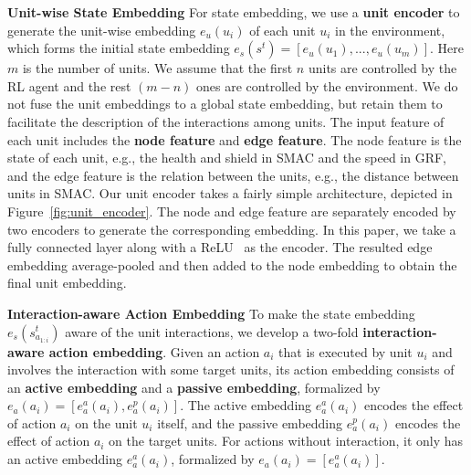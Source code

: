 \documentclass[letterpaper]{article} \usepackage{aaai23}  \usepackage{times}  \usepackage{helvet}  \usepackage{courier}  \usepackage[hyphens]{url}  \usepackage{graphicx} \urlstyle{rm} \def\UrlFont{\rm}  \usepackage{natbib}  \usepackage{caption} \frenchspacing  \setlength{\pdfpagewidth}{8.5in} \setlength{\pdfpageheight}{11in} \usepackage{algorithm}
\begin{document}
\textbf{Unit-wise State Embedding} For state embedding, we use a \textbf{unit encoder} to generate the unit-wise embedding $e_u\left(u_i\right)$ of each unit $u_i$ in the environment, which forms the initial state embedding $e_s\left(s^t\right)=\left[e_u\left(u_1\right),...,e_u\left(u_m\right)\right]$. Here $m$ is the number of units. We assume that the first $n$ units are controlled by the RL agent and the rest $(m-n)$ ones are controlled by the environment. We do not fuse the unit embeddings to a global state embedding, but retain them to facilitate the description of the interactions among units. The input feature of each unit includes the \textbf{node feature} and \textbf{edge feature}. The node feature is the state of each unit, e.g., the health and shield in SMAC and the speed in GRF, and the edge feature is the relation between the units, e.g., the distance between units in SMAC. Our unit encoder takes a fairly simple architecture, depicted in Figure~\ref{fig:unit_encoder}. The node and edge feature are separately encoded by two encoders to generate the corresponding embedding. In this paper, we take a fully connected layer along with a ReLU~\citeyear{relu} as the encoder. The resulted edge embedding average-pooled and then added to the node embedding to obtain the final unit embedding. 

\textbf{Interaction-aware Action Embedding} 
To make the state embedding $e_s\left(s_{a_{1:{i}}}^t\right)$ aware of the unit interactions, we develop a two-fold \textbf{interaction-aware action embedding}. Given an action $a_i$ that is executed by unit $u_i$ and involves the interaction with some target units, its action embedding consists of an \textbf{active embedding} and a \textbf{passive embedding}, formalized by $e_a\left(a_{i}\right) = \left[e_a^{a}\left(a_{i}\right), e_a^{p}\left(a_{i}\right)\right]$. The active embedding $e_a^{a}\left(a_{i}\right)$ encodes the effect of action $a_i$ on the unit $u_i$ itself, and the passive embedding $e_a^p\left(a_{i}\right)$ encodes the effect of action $a_i$ on the target units. For actions without interaction, it only has an active embedding $e_a^a\left(a_{i}\right)$, formalized by $e_a\left(a_{i}\right)=\left[e_a^a\left(a_{i}\right)\right]$.
\end{document}
